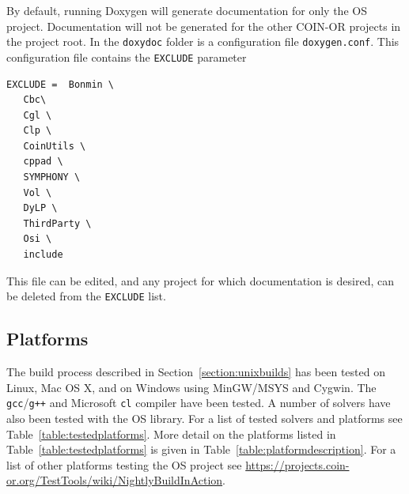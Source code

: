 \documentclass[11pt]{article}
\renewcommand{\_}{{\char"5F}}
\renewcommand{\{}{{\char"7B}}
\renewcommand{\}}{{\char"7D}}
\renewcommand{\^}{{\char"0D}}
\renewcommand{\'}{{\char"0D}}
\begin{document}
\begin{enumerate}[Step 1:]
By default, running Doxygen will generate documentation for only the  OS project.  Documentation will not be generated for the other COIN-OR projects in the project root. In the {\tt doxydoc}  folder is a configuration file {\tt doxygen.conf}.  This configuration file contains the {\tt EXCLUDE} parameter

\begin{verbatim}
EXCLUDE =  Bonmin \
   Cbc\
   Cgl \
   Clp \
   CoinUtils \
   cppad \
   SYMPHONY \
   Vol \
   DyLP \
   ThirdParty \
   Osi \
   include
\end{verbatim}

This file can be edited, and any project for which documentation is desired, can be deleted from the {\tt EXCLUDE} list.%





\subsection{Platforms}

The build process described in Section~\ref{section:unixbuilds} has been tested on Linux, 
Mac OS X, and on Windows using  MinGW/MSYS and Cygwin. 
The  {\tt gcc}/{\tt g++} and Microsoft {\tt cl} compiler have been tested. 
A number of solvers have also been tested with the OS library. For a list of tested solvers and platforms see 
Table~\ref{table:testedplatforms}.  More detail on the platforms listed in Table~\ref{table:testedplatforms} 
is given in Table~\ref{table:platformdescription}.  For a list of other  platforms testing the OS project 
see \url{https://projects.coin-or.org/TestTools/wiki/NightlyBuildInAction}.



\end{enumerate}
\end{document}
